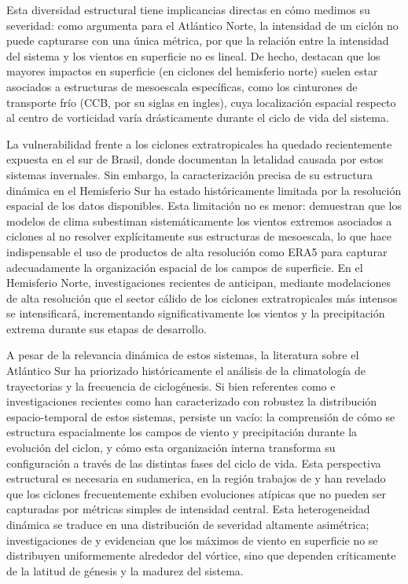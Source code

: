 Esta diversidad estructural tiene implicancias directas en cómo medimos su severidad: como argumenta \citet{corner2025classification} para el Atlántico Norte, la intensidad de un ciclón no puede capturarse con una única métrica, por que la relación entre la intensidad del sistema y los vientos en superficie no es lineal. De hecho, \citet{eisenstein2023identification} destacan que los mayores impactos en superficie (en ciclones del hemisferio norte) suelen estar asociados a estructuras de mesoescala específicas, como los cinturones de transporte frío (CCB, por su siglas en ingles), cuya localización espacial respecto al centro de vorticidad varía drásticamente durante el ciclo de vida del sistema. 


La vulnerabilidad frente a los ciclones extratropicales ha quedado recientemente expuesta en el sur de Brasil, donde \citet{bartolomei2024extremos} documentan la letalidad causada por estos sistemas invernales. Sin embargo, la caracterización precisa de su estructura dinámica en el Hemisferio Sur ha estado históricamente limitada por la resolución espacial de los datos disponibles. Esta limitación no es menor: \citet{priestley2022improved} demuestran que los modelos de clima subestiman sistemáticamente los vientos extremos asociados a ciclones al no resolver explícitamente sus estructuras de mesoescala, lo que hace indispensable el uso de productos de alta resolución como ERA5 para capturar adecuadamente la organización espacial de los campos de superficie. En el Hemisferio Norte, investigaciones recientes de \citet{gentile2025response} anticipan, mediante modelaciones de alta resolución que el sector cálido de los ciclones extratropicales más intensos se intensificará, incrementando significativamente los vientos y la precipitación extrema durante sus etapas de desarrollo.

A pesar de la relevancia dinámica de estos sistemas, la literatura sobre el Atlántico Sur ha priorizado históricamente el análisis de la climatología de trayectorias y la frecuencia de ciclogénesis. Si bien referentes como \citet{gramcianinov2020analysis} e investigaciones recientes como \citet{padilhareinke2026characterization} han caracterizado con robustez la distribución espacio-temporal de estos sistemas, persiste un vacío: la comprensión de cómo se estructura espacialmente los campos de viento y precipitación durante la evolución del ciclon, y cómo esta organización interna transforma su configuración a través de las distintas fases del ciclo de vida. Esta perspectiva estructural es necesaria en sudamerica, en la región trabajos de \citet{gozzo2013air} y \citet{reboita2022from} han revelado que los ciclones frecuentemente exhiben evoluciones atípicas que no pueden ser capturadas por métricas simples de intensidad central. Esta heterogeneidad dinámica se traduce en una distribución de severidad altamente asimétrica; investigaciones de \citet{bitencourt2010relating} y \citet{cardoso2022synoptic} evidencian que los máximos de viento en superficie no se distribuyen uniformemente alrededor del vórtice, sino que dependen críticamente de la latitud de génesis y la madurez del sistema.

